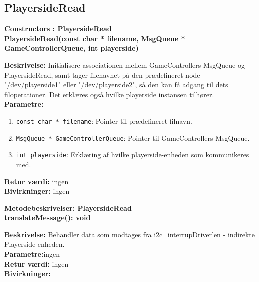 \documentclass[Softwaredesign/Softwaredesign_main.tex]{subfiles}
\begin{document}
\subsection{PlayersideRead}
{\large\textbf{Constructors : PlayersideRead}}\\[0.2cm]
\textbf{PlayersideRead(const char * filename, MsgQueue * GameControllerQueue, int playerside)}
\begin{adjustwidth}{1cm}{0pt}
\textbf{Beskrivelse:} Initialisere associationen mellem GameControllers MsgQueue og PlayersideRead, samt tager filenavnet på den prædefineret node "/dev/playerside1" eller "/dev/playerside2", så den kan få adgang til dets filoperationer. Det erklæres også hvilke playerside instansen tilhører. \\[0.2cm]
\textbf{Parametre:} 
\begin{enumerate}
    \item \lstinline{const char * filename}: Pointer til prædefineret filnavn. 
    \item \lstinline{MsgQueue * GameControllerQueue}: Pointer til GameControllers MsgQueue. 
    \item \lstinline{int playerside}: Erklæring af hvilke playerside-enheden som kommunikeres med. 
\end{enumerate}
\textbf{Retur værdi:} ingen \\[0.2cm]
\textbf{Bivirkninger:} ingen \\[0.2cm]
\end{adjustwidth}

{\large\textbf{Metodebeskrivelser: PlayersideRead}}\\[0.2cm]
\textbf{translateMessage(): void}
\begin{adjustwidth}{1cm}{0pt}
\textbf{Beskrivelse:} Behandler data som modtages fra i2c\_interrupDriver'en - indirekte Playerside-enheden.\\[0.2cm]
\textbf{Parametre:}ingen \\[0.2cm]
\textbf{Retur værdi:} ingen \\[0.2cm]
\textbf{Bivirkninger:} \\[0.2cm]
\end{adjustwidth}
\end{document}
